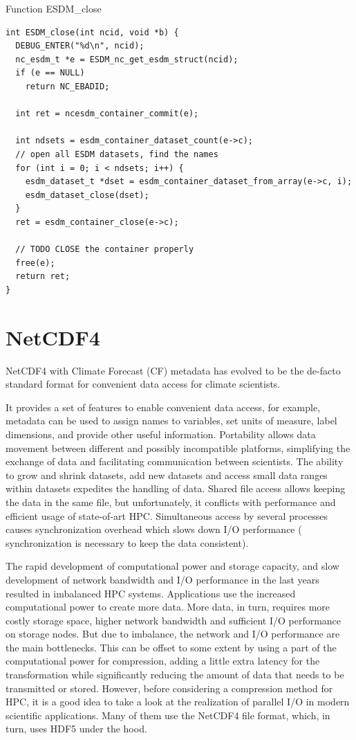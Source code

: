 \begin{tcbcode}[label=esdm-close]{Function ESDM\_close}
\begin{lstlisting}[upquote=true]
int ESDM_close(int ncid, void *b) {
  DEBUG_ENTER("%d\n", ncid);
  nc_esdm_t *e = ESDM_nc_get_esdm_struct(ncid);
  if (e == NULL)
    return NC_EBADID;

  int ret = ncesdm_container_commit(e);

  int ndsets = esdm_container_dataset_count(e->c);
  // open all ESDM datasets, find the names
  for (int i = 0; i < ndsets; i++) {
    esdm_dataset_t *dset = esdm_container_dataset_from_array(e->c, i);
    esdm_dataset_close(dset);
  }
  ret = esdm_container_close(e->c);

  // TODO CLOSE the container properly
  free(e);
  return ret;
}
\end{lstlisting}
\end{tcbcode}

\chapter{NetCDF4}

NetCDF4 with Climate Forecast (CF) metadata has evolved to be the de-facto standard format for convenient data access for climate scientists.

It provides a set of features to enable convenient data access, for example, metadata can be used to assign names to variables, set units of measure, label dimensions, and provide other useful information.
Portability allows data movement between different and possibly incompatible platforms, simplifying the exchange of data and facilitating communication between scientists.
The ability to grow and shrink datasets, add new datasets and access small data ranges within datasets expedites the handling of data.
Shared file access allows keeping the data in the same file, but
unfortunately, it conflicts with performance and efficient usage of state-of-art HPC.
Simultaneous access by several processes causes synchronization overhead which slows down I/O performance (
synchronization is necessary to keep the data consistent).

The rapid development of computational power and storage capacity, and slow development of network bandwidth and I/O performance in the last years resulted in imbalanced HPC systems.
Applications use the increased computational power to create more data.
More data, in turn, requires more costly storage space, higher network bandwidth and sufficient I/O performance on storage nodes.
But due to imbalance, the network and I/O performance are the main bottlenecks.
This can be offset to some extent by using a part of the computational power for compression, adding a little extra latency for the transformation while significantly reducing the amount of data that needs to be transmitted or stored.
However, before considering a compression method for HPC, it is a good idea to take a look at the realization of parallel I/O in modern scientific applications.
Many of them use the NetCDF4 file format, which, in turn, uses HDF5 under the hood.

